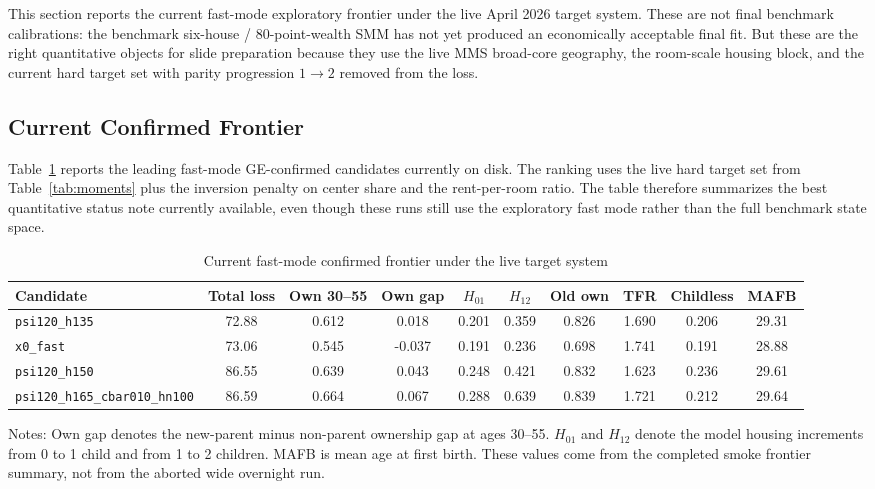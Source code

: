 \documentclass[11pt]{article}
\begin{document}
This section reports the current fast-mode exploratory frontier under the live April 2026 target system. These are not final benchmark calibrations: the benchmark six-house / 80-point-wealth SMM has not yet produced an economically acceptable final fit. But these are the right quantitative objects for slide preparation because they use the live MMS broad-core geography, the room-scale housing block, and the current hard target set with parity progression $1 \to 2$ removed from the loss.

\subsection{Current Confirmed Frontier}

Table~\ref{tab:current_frontier} reports the leading fast-mode GE-confirmed candidates currently on disk. The ranking uses the live hard target set from Table~\ref{tab:moments} plus the inversion penalty on center share and the rent-per-room ratio. The table therefore summarizes the best quantitative status note currently available, even though these runs still use the exploratory fast mode rather than the full benchmark state space.

\begin{table}[!htbp]
\centering
\caption{Current fast-mode confirmed frontier under the live target system}
\label{tab:current_frontier}
\small
\begin{tabular}{lccccccccc}
\toprule
Candidate & Total loss & Own 30--55 & Own gap & $H_{01}$ & $H_{12}$ & Old own & TFR & Childless & MAFB \\
\midrule
\texttt{psi120\_h135} & 72.88 & 0.612 & 0.018 & 0.201 & 0.359 & 0.826 & 1.690 & 0.206 & 29.31 \\
\texttt{x0\_fast} & 73.06 & 0.545 & -0.037 & 0.191 & 0.236 & 0.698 & 1.741 & 0.191 & 28.88 \\
\texttt{psi120\_h150} & 86.55 & 0.639 & 0.043 & 0.248 & 0.421 & 0.832 & 1.623 & 0.236 & 29.61 \\
\texttt{psi120\_h165\_cbar010\_hn100} & 86.59 & 0.664 & 0.067 & 0.288 & 0.639 & 0.839 & 1.721 & 0.212 & 29.64 \\
\bottomrule
\end{tabular}

\medskip
{\footnotesize Notes: Own gap denotes the new-parent minus non-parent ownership gap at ages 30--55. $H_{01}$ and $H_{12}$ denote the model housing increments from 0 to 1 child and from 1 to 2 children. MAFB is mean age at first birth. These values come from the completed smoke frontier summary, not from the aborted wide overnight run.}
\end{table}
\end{document}
